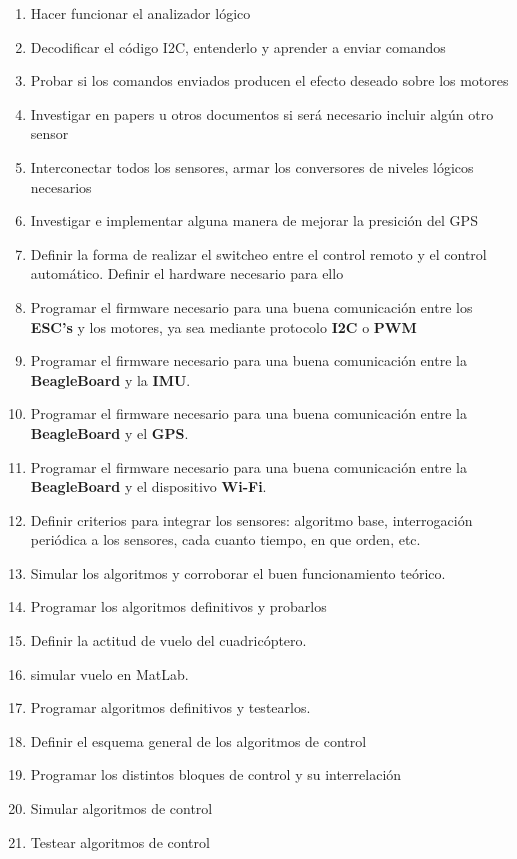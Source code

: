 \documentclass[spanish,12pt,a4paper,titlepage]{report}
\begin{document}
\begin{enumerate}
	\item Hacer funcionar el analizador lógico
	\item Decodificar el código I2C, entenderlo y aprender a enviar comandos
	\item Probar si los comandos enviados producen el efecto deseado sobre los motores
	\item Investigar en papers u otros documentos si será necesario incluir algún otro sensor
	\item Interconectar todos los sensores, armar los conversores de niveles lógicos necesarios
	\item Investigar e implementar alguna manera de mejorar la presición del GPS
	\item Definir la forma de realizar el switcheo entre el control remoto y el control automático. Definir el hardware necesario para ello
	\item Programar el firmware necesario para una buena comunicación entre los \textbf{ESC's} y los motores, ya sea mediante protocolo \textbf{I2C} o \textbf{PWM}
	\item Programar el firmware necesario para una buena comunicación entre la \textbf{BeagleBoard} y la \textbf{IMU}.
	\item Programar el firmware necesario para una buena comunicación entre la \textbf{BeagleBoard} y el \textbf{GPS}.
	\item Programar el firmware necesario para una buena comunicación entre la \textbf{BeagleBoard} y el dispositivo \textbf{Wi-Fi}.
	\item Definir criterios para integrar los sensores: algoritmo base, interrogación periódica a los sensores, cada cuanto tiempo, en que orden, etc.
	\item Simular los algoritmos y corroborar el buen funcionamiento teórico.
	\item Programar los algoritmos definitivos y probarlos
	\item Definir la actitud de vuelo del cuadricóptero.
	\item simular vuelo en MatLab.
	\item Programar algoritmos definitivos y testearlos.
	\item Definir el esquema general de los algoritmos de control
	\item Programar los distintos bloques de control y su interrelación
	\item Simular algoritmos de control
	\item Testear algoritmos de control

\end{enumerate}
\end{document}
